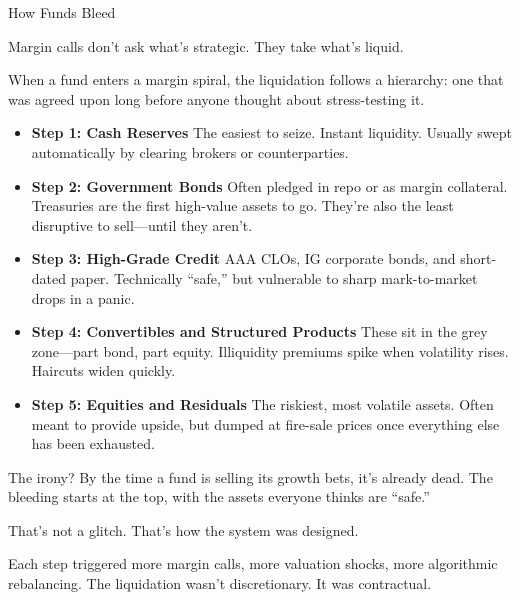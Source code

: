 \begin{TechnicalSidebar}{How Funds Bleed}

  Margin calls don’t ask what’s strategic.  
  They take what’s liquid.
  
  \medskip
  
  When a fund enters a margin spiral, the liquidation follows a hierarchy: one that was agreed upon long before anyone 
  thought about stress-testing it.

  \medskip
  
  \begin{itemize}
    \item \textbf{Step 1: Cash Reserves}  
    The easiest to seize. Instant liquidity. Usually swept automatically by clearing brokers or counterparties.
    
    \item \textbf{Step 2: Government Bonds}  
    Often pledged in repo or as margin collateral. Treasuries are the first high-value assets to go. They’re also the least disruptive to sell—until they aren’t.
    
    \item \textbf{Step 3: High-Grade Credit}  
    AAA CLOs, IG corporate bonds, and short-dated paper. Technically “safe,” but vulnerable to sharp mark-to-market drops in a panic.
    
    \item \textbf{Step 4: Convertibles and Structured Products}  
    These sit in the grey zone—part bond, part equity. Illiquidity premiums spike when volatility rises. Haircuts widen quickly.
    
    \item \textbf{Step 5: Equities and Residuals}  
    The riskiest, most volatile assets. Often meant to provide upside, but dumped at fire-sale prices once everything else has been exhausted.
  \end{itemize}
  
  \medskip
  
  The irony?  
  By the time a fund is selling its growth bets, it’s already dead.  
  The bleeding starts at the top, with the assets everyone thinks are “safe.”

  \medskip
  
  That’s not a glitch.  
  That’s how the system was designed.
  
\end{TechnicalSidebar}

\medskip

Each step triggered more margin calls, more valuation shocks, more algorithmic rebalancing.
The liquidation wasn’t discretionary. It was contractual.

